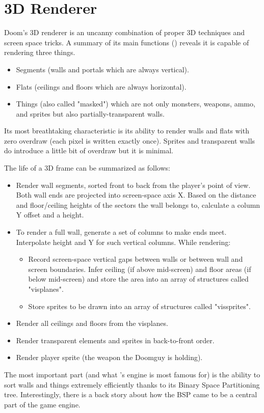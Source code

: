 \section{3D Renderer}
Doom's 3D renderer is an uncanny combination of proper 3D techniques and screen space tricks. A summary of its main functions () reveals it is capable of rendering three things.\\
\par
{}
\par
\begin{itemize}
	\item Segments (walls and portals which are always vertical).
	\item Flats (ceilings and floors which are always horizontal).
	\item Things (also called "masked") which are not only monsters, weapons, ammo, and sprites but also partially-transparent walls.
\end{itemize}
 Its most breathtaking characteristic is its ability to render walls and flats with zero overdraw (each pixel is written exactly once). Sprites and transparent walls do introduce a little bit of overdraw but it is minimal.\\
\par
The life of a 3D frame can be summarized as follows:
\begin{itemize}
\item Render wall segments, sorted front to back from the player's point of view. Both wall ends are projected into screen-space axis X. Based on the distance and floor/ceiling heights of the sectors the wall belongs to, calculate a column Y offset and a height. 
\item To render a full wall, generate a set of columns to make ends meet. Interpolate height and Y for such vertical columns. While rendering:
   \begin{itemize}
     \item Record screen-space vertical gaps between walls or between wall and screen boundaries. Infer ceiling (if above mid-screen) and floor areas (if below mid-screen) and store the area into an array of structures called "visplanes".
     \item Store sprites to be drawn into an array of structures called "vissprites".
   \end{itemize}
\item Render all ceilings and floors from the visplanes.
\item Render transparent elements and sprites in back-to-front order.
\item Render player sprite (the weapon the Doomguy is holding).
\end{itemize}
\par
The most important part (and what \doom{}'s engine is most famous for) is the ability to sort walls and things extremely efficiently thanks to its Binary Space Partitioning tree. Interestingly, there is a back story about how the BSP came to be a central part of the game engine.\\
\par
\pagebreak



